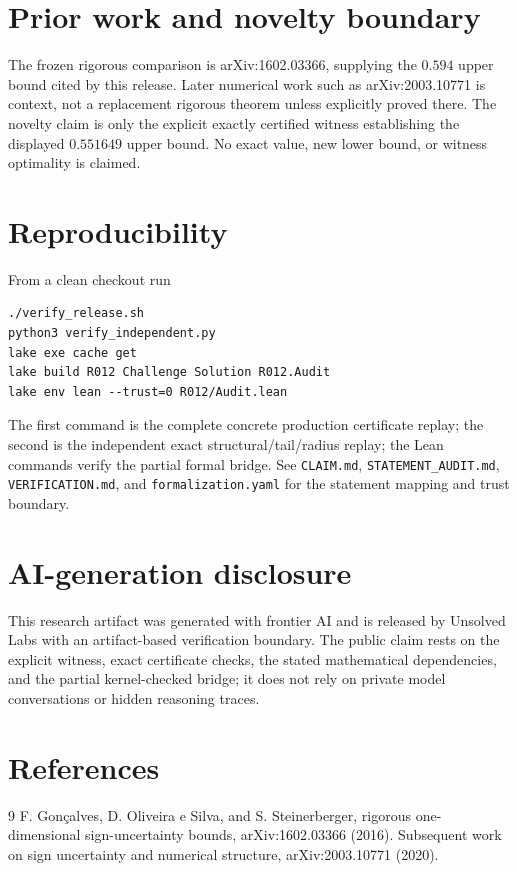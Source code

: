 \documentclass[11pt]{article}
\begin{document}
\section{Prior work and novelty boundary}
The frozen rigorous comparison is arXiv:1602.03366, supplying the $0.594$ upper bound cited by this release.
Later numerical work such as arXiv:2003.10771 is context, not a replacement rigorous theorem unless explicitly proved there.
The novelty claim is only the explicit exactly certified witness establishing the displayed $0.551649$ upper bound.
No exact value, new lower bound, or witness optimality is claimed.

\section{Reproducibility}
From a clean checkout run
\begin{verbatim}
./verify_release.sh
python3 verify_independent.py
lake exe cache get
lake build R012 Challenge Solution R012.Audit
lake env lean --trust=0 R012/Audit.lean
\end{verbatim}
The first command is the complete concrete production certificate replay; the second is the independent exact structural/tail/radius replay; the Lean commands verify the partial formal bridge.
See \texttt{CLAIM.md}, \texttt{STATEMENT\_AUDIT.md}, \texttt{VERIFICATION.md}, and \texttt{formalization.yaml} for the statement mapping and trust boundary.

\section{AI-generation disclosure}
This research artifact was generated with frontier AI and is released by Unsolved Labs with an artifact-based verification boundary.
The public claim rests on the explicit witness, exact certificate checks, the stated mathematical dependencies, and the partial kernel-checked bridge; it does not rely on private model conversations or hidden reasoning traces.

\section{References}
\begin{thebibliography}{9}
F. Gon\c{c}alves, D. Oliveira e Silva, and S. Steinerberger,
rigorous one-dimensional sign-uncertainty bounds, arXiv:1602.03366 (2016).
Subsequent work on sign uncertainty and numerical structure, arXiv:2003.10771 (2020).
\end{thebibliography}
\end{document}

